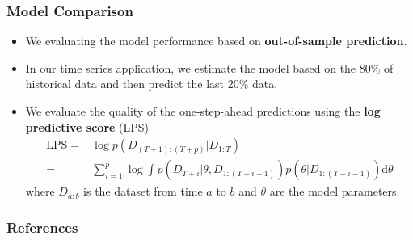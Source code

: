 \documentclass[10pt]{beamer}
\begin{document}
\begin{frame}
  \frametitle{Model Comparison}
  \begin{itemize}
  \item We evaluating the model performance based on \textbf{out-of-sample prediction}.
  \item In our time series application, we estimate the model based on the 80\% of
    historical data and then predict the last 20\% data.

  \item We evaluate the quality of the one-step-ahead predictions using the \textbf{log
      predictive score} (LPS)
    \begin{align*}
      \mathrm{LPS}=&\log p(D_{(T+1):(T+p)}|D_{1:T})\\
      =&\sum\nolimits _{i=1}^{p}\log\int p(D_{T+i}|\theta,D_{1:(T+i-1)})p(\theta|D_{1:(T+i-1)})\mathrm{d}\theta
    \end{align*}
    where $D_{a:b}$ is the dataset from time $a$ to $b$ and $\theta$ are the model
    parameters.
  \end{itemize}
\end{frame}


\begin{frame}[allowframebreaks]
  \frametitle{References}
  
  
\end{frame}
\end{document}

